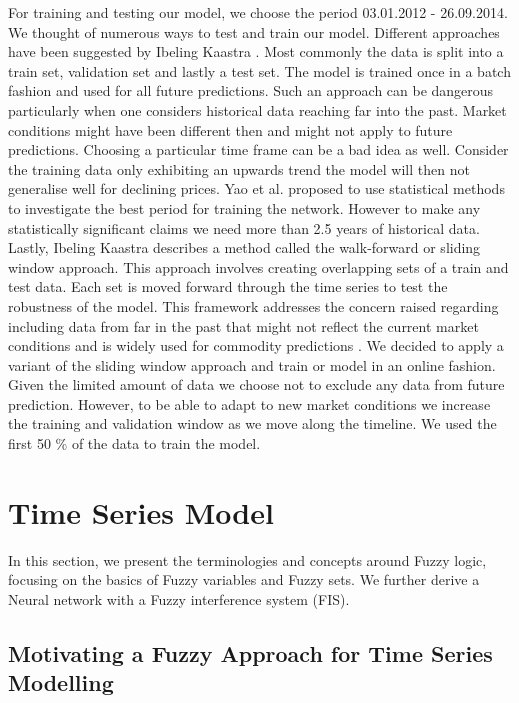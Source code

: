 For training and testing our model, we choose the period 03.01.2012 - 26.09.2014. We thought of numerous ways to test and train our model. Different approaches have been suggested by Ibeling Kaastra \cite{Kaastra96designinga}. Most commonly the data is split into a train set, validation set and lastly a test set. The model is trained once in a batch fashion and used for all future predictions. Such an approach can be dangerous particularly when one considers historical data reaching far into the past. Market conditions might have been different then and might not apply to future predictions. Choosing a particular time frame can be a bad idea as well. Consider the training data only exhibiting an upwards trend the model will then not generalise well for declining prices. Yao et al. \cite{Yao00acase} proposed to use statistical methods to investigate the best period for training the network. However to make any statistically significant claims we need more than 2.5 years of historical data. Lastly, Ibeling Kaastra describes a method called the walk-forward or sliding window approach. This approach involves creating overlapping sets of a train and test data. Each set is moved forward through the time series to test the robustness of the model. This framework addresses the concern raised regarding including data from far in the past that might not reflect the current market conditions and is widely used for commodity predictions \cite{Kaastra96designinga}. We decided to apply a variant of the sliding window approach and train or model in an online fashion. Given the limited amount of data we choose not to exclude any data from future prediction. However, to be able to adapt to new market conditions we increase the training and validation window as we move along the timeline. We used the first 50 \% of the data to train the model. 


\section{Time Series Model}
\label{fuzzy_model}

In this section, we present the terminologies and concepts around Fuzzy logic, focusing on the basics of Fuzzy variables and Fuzzy sets. We further derive a Neural network with a Fuzzy interference system (FIS). 

\subsection{Motivating a Fuzzy Approach for Time Series Modelling}

